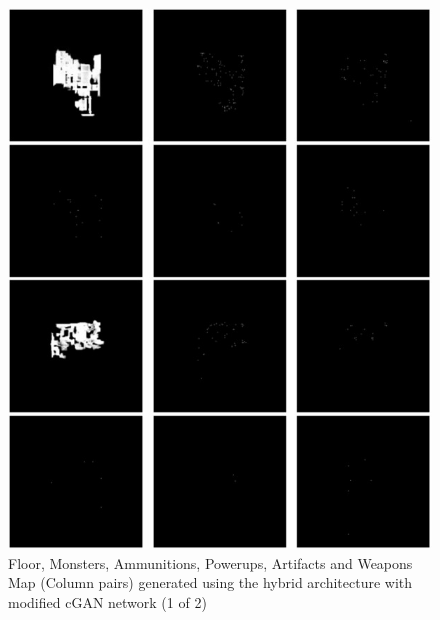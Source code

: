 \documentclass{Configuration_Files/PoliMi3i_thesis}
\begin{document}
\begin{figure}[H]
    \centering
    \includegraphics[width=1\textwidth]{mod_cgan_sample1.jpg}
    \caption[Samples generated using the modified cGAN network (1 of 2)]{Floor, Monsters, Ammunitions, Powerups, Artifacts and Weapons Map 
(Column pairs) generated using the hybrid architecture with modified cGAN network (1 of 2)}
    \label{fig:modcgansample1}
\end{figure}
\end{document}
